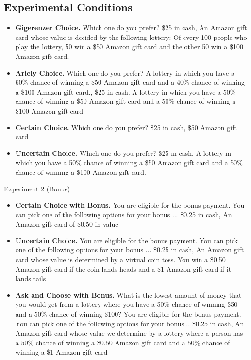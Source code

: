 \documentclass[12pt, letterpaper]{article}
\begin{document}
\subsection{Experimental Conditions}

\begin{itemize}
    \item \textbf{Gigerenzer Choice.} Which one do you prefer? \$25 in cash, An Amazon gift card whose value is decided by the following lottery: Of every 100 people who play the lottery, 50 win a \$50 Amazon gift card and the other 50 win a \$100 Amazon gift card.
    
    \item \textbf{Ariely Choice.} Which one do you prefer? A lottery in which you have a 60\% chance of winning a \$50 Amazon gift card and a 40\% chance of winning a \$100 Amazon gift card., \$25 in cash,  A lottery in which you have a 50\% chance of winning a \$50 Amazon gift card and a 50\% chance of winning a \$100 Amazon gift card.

    \item \textbf{Certain Choice.} Which one do you prefer? \$25 in cash, \$50 Amazon gift card
    
    \item \textbf{Uncertain Choice.} Which one do you prefer? \$25 in cash, A lottery in which you have a 50\% chance of winning a \$50 Amazon gift card and a 50\% chance of winning a \$100 Amazon gift card.
\end{itemize}

Experiment 2 (Bonus)

\begin{itemize}
    \item \textbf{Certain Choice with Bonus.} You are eligible for the bonus payment. You can pick one of the following options for your bonus ... \$0.25 in cash,  An Amazon gift card of \$0.50 in value

    \item \textbf{Uncertain Choice.} You are eligible for the bonus payment. You can pick one of the following options for your bonus ... \$0.25 in cash, An Amazon gift card whose value is determined by a virtual coin toss. You win a \$0.50 Amazon gift card if the coin lands heads and a \$1 Amazon gift card if it lands tails

    \item \textbf{Ask and Choose with Bonus.} What is the lowest amount of money that you would get from a lottery where you have a 50\% chance of winning \$50 and a 50\% chance of winning \$100? You are eligible for the bonus payment. You can pick one of the following options for your bonus .. \$0.25 in cash,  An Amazon gift card whose value we determine by a lottery where a person has a 50\% chance of winning a \$0.50 Amazon gift card and a 50\% chance of winning a \$1 Amazon gift card
\end{itemize}
\end{document}
